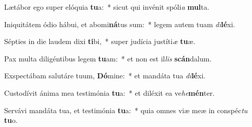 \item Lætábor ego super elóquia \textbf{tu}a:~* sicut qui invénit spóli\textit{a} \textbf{mul}ta.
\item Iniquitátem ódio hábui, et abomi\textbf{ná}tus sum:~* legem autem tuam \textit{di}\textbf{lé}xi.
\item Sépties in die laudem dixi \textbf{ti}bi,~* super judícia justíti\textit{æ} \textbf{tu}æ.
\item Pax multa diligéntibus legem \textbf{tu}am:~* et non est il\textit{lis} \textbf{scán}dalum.
\item Exspectábam salutáre tuum, \textbf{Dó}mine:~* et mandáta tua \textit{di}\textbf{lé}xi.
\item Custodívit ánima mea testimónia \textbf{tu}a:~* et diléxit ea ve\textit{he}\textbf{mén}ter.
\item Servávi mandáta tua, et testimónia \textbf{tu}a:~* quia omnes viæ meæ in conspéc\textit{tu} \textbf{tu}o.
